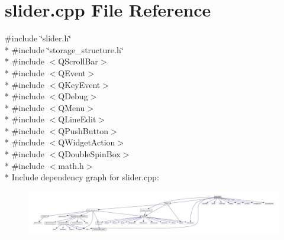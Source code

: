 \hypertarget{a00133}{\section{slider.\+cpp File Reference}
\label{a00133}
}
{\ttfamily \#include \char`\"{}slider.\+h\char`\"{}}\\*
{\ttfamily \#include \char`\"{}storage\+\_\+structure.\+h\char`\"{}}\\*
{\ttfamily \#include $<$Q\+Scroll\+Bar$>$}\\*
{\ttfamily \#include $<$Q\+Event$>$}\\*
{\ttfamily \#include $<$Q\+Key\+Event$>$}\\*
{\ttfamily \#include $<$Q\+Debug$>$}\\*
{\ttfamily \#include $<$Q\+Menu$>$}\\*
{\ttfamily \#include $<$Q\+Line\+Edit$>$}\\*
{\ttfamily \#include $<$Q\+Push\+Button$>$}\\*
{\ttfamily \#include $<$Q\+Widget\+Action$>$}\\*
{\ttfamily \#include $<$Q\+Double\+Spin\+Box$>$}\\*
{\ttfamily \#include $<$math.\+h$>$}\\*
Include dependency graph for slider.\+cpp\+:
\nopagebreak
\begin{figure}[H]
\begin{center}
\leavevmode
\includegraphics[width=350pt]{d1/dc6/a00347}
\end{center}
\end{figure}
